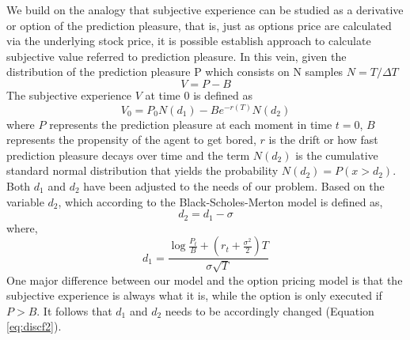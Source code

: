 \documentclass[11pt,twocolumn]{article}
\begin{document}
We build on the analogy that subjective experience can be studied as a derivative or option of the prediction pleasure, that is, just as options price are calculated via the underlying stock price, it is possible establish approach to calculate subjective value referred to prediction pleasure. 
In this vein, given the distribution of the prediction pleasure P which consists on N samples $N = T / \Delta T$
\begin{equation}
V = P - B 
\label{eq:bsmadap1ap}
\end{equation}  
The subjective experience $V$ at time 0 is defined as 
\begin{equation}
V_0 =P_0 N(d_1)  - B e^ {-r(T)}N(d_2)
\label{eq:bsmadap2ap}
\end{equation}
where $P$ represents the prediction pleasure at each moment in time $t=0$, $B$ represents the propensity of the agent to get bored, $r$ is the drift or how fast prediction pleasure decays over time and the term $N(d_2)$ is the cumulative standard normal distribution that yields the probability $N(d_2) = P(x > d_2)$. Both $d_1$ and $d_2$ have been  adjusted to the needs of our problem. 
Based on the variable $d_2$, which according to the Black-Scholes-Merton model is defined as, 
\begin{equation}
 d_2 = d_1 - \sigma
\label{eq:instbsmd22}
\end{equation}
 where, 
 \begin{equation}
 d_1 =  \frac{\log \frac{P_t}{B} + (r_t + \frac{\sigma^2}{2})T} {\sigma \sqrt T}
 \label{eq:bsmd31}
 \end{equation} 
One major difference between our model and the option pricing model is that the subjective experience is always what it is, while the option is only executed if $P>B$. It follows that $d_1$ and $d_2$ needs to be accordingly changed (Equation \ref{eq:discf2}).



\end{document}
